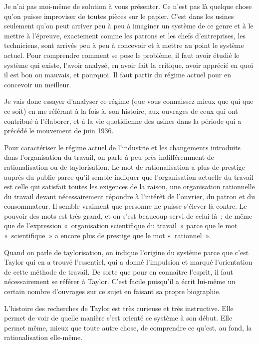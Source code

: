 \documentclass[french,twoside]{book} %
\begin{document}
Je n'ai pas moi-même de solution à vous présenter. Ce n'est pas là quelque chose qu'on puisse improviser de toutes pièces sur le papier. C'est dans les usines seulement qu'on peut arriver peu à peu à imaginer un système de ce genre et à le mettre à l'épreuve, exactement comme les patrons et les chefs d'entreprises, les techniciens, sont arrivés peu à peu à concevoir et à mettre au point le système actuel. Pour comprendre comment se pose le problème, il faut avoir étudié le système qui existe, l'avoir analysé, en avoir fait la critique, avoir apprécié en quoi il est bon ou mauvais, et pourquoi. Il faut partir du régime actuel pour en concevoir un meilleur.\par
Je vais donc essayer d'analyser ce régime (que vous connaissez mieux que qui que ce soit) en me référant à la fois à. son histoire, aux ouvrages de ceux qui ont contribué à l'élaborer, et à la vie quotidienne des usines dans la période qui a précédé le mouvement de juin 1936.\par
Pour caractériser le régime actuel de l'industrie et les changements introduits dans l'organisation du travail, on parle à peu près indifféremment de rationalisation ou de taylorisation. Le mot de rationalisation a plus de prestige auprès du public parce qu'il semble indiquer que l'organisation actuelle du travail est celle qui satisfait toutes les exigences de la raison, une organisation rationnelle du travail devant nécessairement répondre à l'intérêt de l'ouvrier, du patron et du consommateur. Il semble vraiment que personne ne puisse s'élever là contre. Le pouvoir des mots est très grand, et on s'est beaucoup servi de celui-là ; de même que de l'expression « organisation scientifique du travail » parce que le mot « scientifique » a encore plus de prestige que le mot « rationnel ».\par
Quand on parle de taylorisation, on indique l'origine du système parce que c'est Taylor qui en a trouvé l'essentiel, qui a donné l'impulsion et marqué l'orientation de cette méthode de travail. De sorte que pour en connaître l'esprit, il faut nécessairement se référer à Taylor. C'est facile puisqu'il a écrit lui-même un certain nombre d'ouvrages sur ce sujet en faisant sa propre biographie.\par
L'histoire des recherches de Taylor est très curieuse et très instructive. Elle permet de voir de quelle manière s'est orienté ce système à son début. Elle permet même, mieux que toute autre chose, de comprendre ce qu'est, au fond, la rationalisation elle-même.\par
\end{document}
